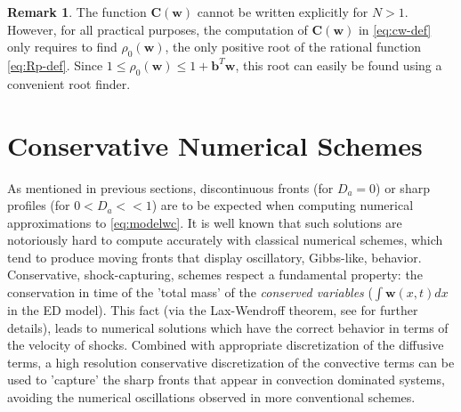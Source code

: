 \documentclass[preprint]{elsarticle}
\theoremstyle{definition}
\newtheorem{remark}{Remark}[section]
\newcommand{\bbw}{{\boldsymbol w}}
\newcommand{\bw}{\boldsymbol w}
\newcommand{\bC}{\boldsymbol C}
\newcommand{\bb}{\boldsymbol b}
\begin{document}
\begin{remark}\label{remark:1}
 The  function ${\boldsymbol C}({\boldsymbol  w})$
cannot be written 
explicitly for $N>1$. However, for all practical purposes, the  computation of
$\bC(\bbw)$ in \eqref{eq:cw-def} only requires to  find  $\rho_0(\bw)$,
   the only positive root of
the rational function \eqref{eq:Rp-def}.
Since $1 \leq \rho_0(\bw)\leq 1+\bb^T \bw$,   this root can easily be   found using a convenient  root finder. 
\end{remark}






 




 

\section{Conservative Numerical Schemes}\label{sec:NumScheme}

As mentioned in previous sections, discontinuous fronts (for $D_a=0$)
or sharp profiles (for $0<D_a<<1$) are to be  expected when computing
numerical approximations to \eqref{eq:modelwc}. 
 It is well known that such solutions  are notoriously hard 
 to compute accurately with 
classical numerical schemes, which tend to produce moving fronts that
display oscillatory, Gibbs-like, behavior.  Conservative,
shock-capturing, schemes respect a fundamental property: the conservation 
in time of the 'total mass' of  the {\em conserved variables} ($\int
\bw(x,t) dx$
in the ED model). This fact (via the Lax-Wendroff
theorem, see \cite{Levequeb} for further details), leads to  
numerical solutions which have  the correct behavior in terms of the
velocity  of shocks.  Combined
with appropriate 
discretization of the diffusive terms, a high resolution conservative
discretization of the convective terms can be used to 
'capture' the sharp fronts that appear in convection dominated
systems, avoiding the numerical oscillations observed in more
conventional schemes.
\end{document}
